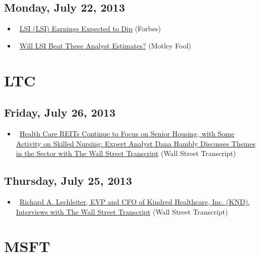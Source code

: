 \documentclass[11pt,asymmetric]{article}
\begin{document}
\subsection*{Monday, July 22, 2013}
\begin{itemize}
\item\ \href{http://www.forbes.com/sites/narrativescience/2013/07/22/lsi-lsi-earnings-expected-to-dip/?partner=yahootix}{LSI (LSI) Earnings Expected to Dip} (Forbes)
\item\ \href{http://www.fool.com/investing/general/2013/07/22/will-lsi-beat-these-analyst-estimates.aspx?source=eptyholnk303100&logvisit=y&npu=y}{Will LSI Beat These Analyst Estimates?} (Motley Fool)
\end{itemize}

\section*{LTC}

\subsection*{Friday, July 26, 2013}
\begin{itemize}
\item\ \href{http://finance.yahoo.com/news/health-care-reits-continue-focus-152700690.html}{Health Care REITs Continue to Focus on Senior Housing, with Some Activity on Skilled Nursing: Expert Analyst Dana Hambly Discusses Themes in the Sector with The Wall Street Transcript} (Wall Street Transcript)
\end{itemize}
\subsection*{Thursday, July 25, 2013}
\begin{itemize}
\item\ \href{http://finance.yahoo.com/news/richard-lechleiter-evp-cfo-kindred-202000532.html}{Richard A. Lechleiter, EVP and CFO of Kindred Healthcare, Inc. (KND), Interviews with The Wall Street Transcript} (Wall Street Transcript)
\end{itemize}

\section*{MSFT}
\end{document}

